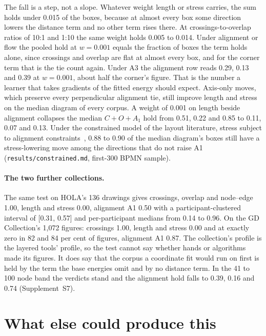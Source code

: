 \documentclass[11pt]{article}
\begin{document}
The fall is a step, not a slope. Whatever weight length or stress carries, the sum holds
under 0.015 of the boxes, because at almost every box some direction lowers the distance
term and no other term rises there. At crossings-to-overlap ratios of 10:1 and 1:10 the
same weight holds 0.005 to 0.014. Under alignment or flow the pooled hold at $w = 0.001$
equals the fraction of boxes the term holds alone, since crossings and overlap are flat at
almost every box, and for the corner term that is the tie count again. Under A3 the
alignment row reads 0.29, 0.13 and 0.39 at $w = 0.001$, about half the corner's figure.
That is the number a learner that takes gradients of the fitted energy should expect.
Axis-only moves, which preserve every perpendicular alignment tie, still improve length
and stress on the median diagram of every corpus. A weight of 0.001 on length beside
alignment collapses the median $C{+}O{+}A_1$ hold from 0.51, 0.22 and 0.85 to 0.11, 0.07 and 0.13.
Under the constrained model of the layout literature, stress subject to alignment
constraints~\cite{ipsepcola06, dunnart08, setcola18}, 0.88 to 0.90 of the median
diagram's boxes still have a stress-lowering move among the directions that do not raise
A1 (\texttt{results/constrained.md}, first-300 BPMN sample).

\paragraph{The two further collections.} The same test on HOLA's 136 drawings gives
crossings, overlap and node--edge 1.00, length and stress 0.00, alignment A1 0.50 with a
participant-clustered interval of [0.31, 0.57] and per-participant medians from 0.14 to
0.96. On the GD Collection's 1,072 figures: crossings 1.00, length and stress 0.00 and at
exactly zero in 82 and 84 per cent of figures, alignment A1 0.87. The collection's
profile is the layered tools' profile, so the test cannot say whether hands or algorithms
made its figures. It does say that the corpus a coordinate fit would run on first is held
by the term the base energies omit and by no distance term. In the 41 to 100 node
band the verdicts stand and the alignment hold falls to 0.39, 0.16 and 0.74
(Supplement~S7).

\section{What else could produce this}\label{sec:alternatives}


\end{document}
